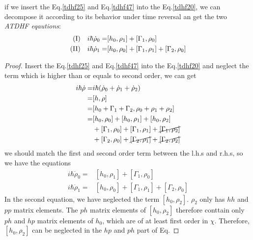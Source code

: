   if we insert the Eq.\eqref{tdhf25} and Eq.\eqref{tdhf47} into the Eq.\eqref{tdhf20}, we can decompose it according to its behavior under time reversal an get the two \textit{ATDHF eqautions}:
  \begin{subequations}
    \begin{align}
      \label{tdhf50a} {\rm (I)} \quad i\hbar\dot{\rho}_0 =& [h_0, \rho_1] + [\Gamma_1, \rho_0]  \\
      \label{tdhf50b} {\rm (II)} \quad i\hbar\dot{\rho}_1 =& [h_0, \rho_0] + [\Gamma_1, \rho_1] + [\Gamma_2, \rho_0]
    \end{align}
  \end{subequations}
  \begin{proof}
    Insert the Eq.\eqref{tdhf25} and Eq.\eqref{tdhf47} into the Eq.\eqref{tdhf20} and neglect the term which is higher than or equals to second order, we can get
    \begin{equation}
      \begin{aligned}
        i\hbar\dot{\rho} =& i\hbar(\dot{\rho}_0 + \dot{\rho}_1 + \dot{\rho}_2)  \\
                         =& [h, \rho] \\
                         =& [h_0 + \Gamma_1 + \Gamma_2, \rho_0 + \rho_1 + \rho_2]\\
                         =& [h_0, \rho_0] + [h_0, \rho_1] + [h_0, \rho_2] \\
                          & +[\Gamma_1, \rho_0] + [\Gamma_1, \rho_1] + \cancel{[\Gamma_1, \rho_2]} \\
                          & +[\Gamma_2, \rho_0] + \cancel{[\Gamma_2, \rho_1]} + \cancel{[\Gamma_2, \rho_2]} \\
      \end{aligned}
    \end{equation}
    we should match the first and second order term between the l.h.s and r.h.s, so we have the equations
    \begin{equation*}
      \begin{aligned}
        i\hbar\dot{\rho}_0 =& [h_0, \rho_1] + [\Gamma_1, \rho_0]  \\
        i\hbar\dot{\rho}_1 =& [h_0, \rho_0] + [\Gamma_1, \rho_1] + [\Gamma_2, \rho_0]
      \end{aligned}
    \end{equation*}
    In the second equation, we have neglected the term $[h_0, \rho_2]$. $\rho_2$ only has $hh$ and $pp$ matrix elements. The $ph$ matrix elements of $[h_0, \rho_2]$ therefore conttain only $ph$ and $hp$ matrix elements of $h_0$, which are of at least first order in $\chi$. Therefore,  $[h_0, \rho_2]$ can be neglected in the $hp$ and $ph$ part of Eq.
  \end{proof}
  
